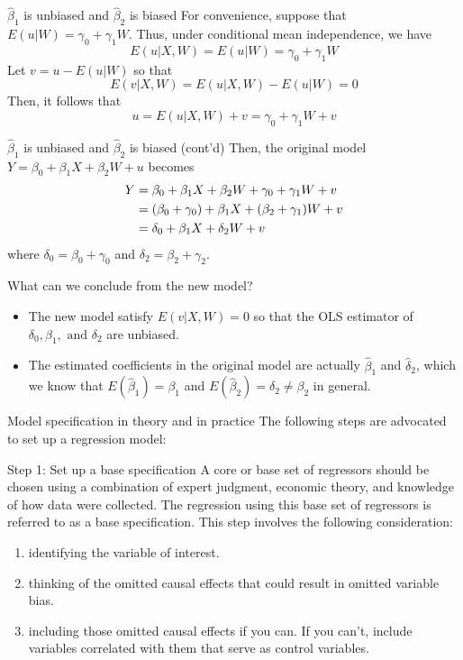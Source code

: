 \documentclass[presentation,10pt]{beamer}
\begin{document}
\begin{frame}[label={sec:org254ae90}]{\(\hat{\beta}_1\) is unbiased and \(\hat{\beta}_2\) is biased}
For convenience, suppose that \(E(u|W) = \gamma_0 + \gamma_1 W\). Thus,
under conditional mean independence, we have
\[ E(u|X,W) = E(u|W) = \gamma_0 + \gamma_1 W \]
Let \(v = u - E(u|W)\) so that
\[E(v|X, W) = E(u|X,W) - E(u|W) = 0 \]
Then, it follows that
\[ u = E(u|X,W) + v = \gamma_0 + \gamma_1 W + v \]
\end{frame}

\begin{frame}[label={sec:org3b084bb}]{\(\hat{\beta}_1\) is unbiased and \(\hat{\beta}_2\) is biased (cont'd)}
Then, the original model \(Y = \beta_0 + \beta_1 X + \beta_2 W + u\)
becomes
\begin{equation}
\begin{split}
Y &= \beta_0 + \beta_1 X + \beta_2 W + \gamma_0 + \gamma_1 W + v \notag \\
&= (\beta_0 + \gamma_0) + \beta_1 X + (\beta_2 + \gamma_1) W + v \notag \\
&= \delta_0 + \beta_1 X + \delta_2 W + v
\end{split}
\end{equation}
where \(\delta_0 = \beta_0 + \gamma_0\) and \(\delta_2 = \beta_2 +
\gamma_2\).

What can we conclude from the new model?
\begin{itemize}
\item The new model satisfy \(E(v|X,W) = 0\) so that the OLS estimator of
\(\delta_0, \beta_1, \text{ and } \delta_2\) are unbiased.
\item The estimated coefficients in the original model are actually
\(\hat{\beta}_1\) and \(\hat{\delta}_2\), which we know that
\(E(\hat{\beta}_1) = \beta_1\) and \(E(\hat{\beta}_2) = \delta_2 \neq
  \beta_2\) in general.
\end{itemize}
\end{frame}

\begin{frame}[label={sec:org4360409}]{Model specification in theory and in practice}
The following steps are advocated to set up a regression model:

\begin{block}{Step 1: Set up a base specification}
A core or base set of regressors should be chosen using a
combination of expert judgment, economic theory, and knowledge of
how data were collected. The regression using this base set of
regressors is referred to as a \alert{base specification}. This step
involves the following consideration:
\begin{enumerate}
\item identifying the variable of interest.
\item thinking of the omitted causal effects that could result in omitted
variable bias.
\item including those omitted causal effects if you can. If you
can’t, include variables correlated with them that serve as
control variables.
\end{enumerate}
\end{block}
\end{frame}
\end{document}
